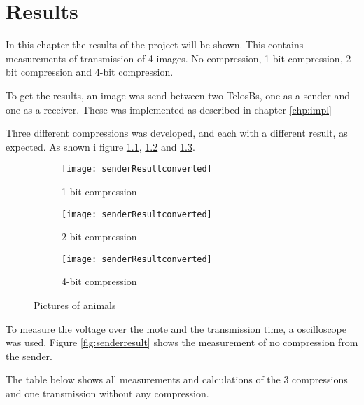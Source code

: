 \chapter{Results}
\label{chp:results}

In this chapter the results of the project will be shown. This contains measurements of transmission of 4 images. No compression, 1-bit compression, 2-bit compression and 4-bit compression.

To get the results, an image was send between two TelosBs, one as a sender and one as a receiver. These was implemented as described in chapter \ref{chp:impl}

Three different compressions was developed, and each with a different result, as expected. As shown i figure \ref{fig:one}, \ref{fig:two} and \ref{fig:four}.

\begin{figure}[h]
	\centering
	\begin{subfigure}{0.3\textwidth}
		\texttt{[image: senderResultconverted]}
		\caption{1-bit compression}
		\label{fig:one}
	\end{subfigure}
	\begin{subfigure}{0.3\textwidth}
		\texttt{[image: senderResultconverted]}
		\caption{2-bit compression}
		\label{fig:two}
	\end{subfigure}
	\begin{subfigure}{0.3\textwidth}
		\texttt{[image: senderResultconverted]}
		\caption{4-bit compression}
		\label{fig:four}
	\end{subfigure}
	\caption{Pictures of animals}\label{fig:animals}
\end{figure}


To measure the voltage over the mote and the transmission time, a oscilloscope was used. Figure \ref{fig:senderresult} shows the measurement of no compression from the sender. 



The table below shows all measurements and calculations of the 3 compressions and one transmission without any compression.

